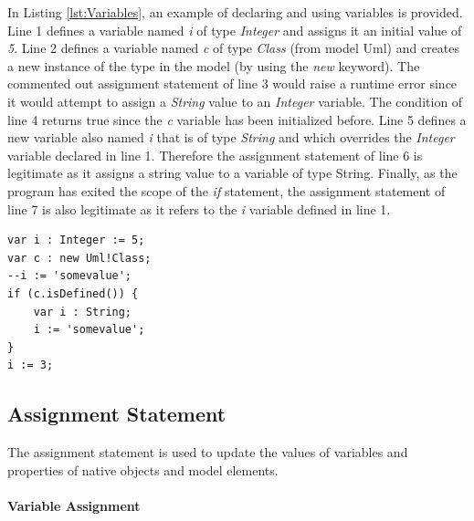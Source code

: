 In Listing \ref{lst:Variables}, an example of declaring and using variables is provided. Line 1 defines a variable named \emph{i} of type \emph{Integer} and assigns it an initial value of \emph{5}. Line 2 defines a variable named \emph{c} of type \emph{Class} (from model Uml) and creates a new instance of the type in the model (by using the \emph{new} keyword). The commented out assignment statement of line 3 would raise a runtime error since it would attempt to assign a \emph{String} value to an \emph{Integer} variable. The condition of line 4 returns true since the \emph{c} variable has been initialized before. Line 5 defines a new variable also named \emph{i} that is of type \emph{String} and which overrides the \emph{Integer} variable declared in line 1. Therefore the assignment statement of line 6 is legitimate as it assigns a string value to a variable of type String. Finally, as the program has exited the scope of the \emph{if} statement, the assignment statement of line 7 is also legitimate as it refers to the \emph{i} variable defined in line 1.

\begin{lstlisting}[basicstyle=\ttfamily\footnotesize, flexiblecolumns=true, numbers=none, nolol=true, caption=Example illustrating declaration and use of variables, label=lst:Variables, numbers=left, language=EOL, tabsize=2]
var i : Integer := 5;
var c : new Uml!Class;
--i := 'somevalue';
if (c.isDefined()) {
	var i : String;
	i := 'somevalue';
}
i := 3;
\end{lstlisting}

\subsection{Assignment Statement}

The assignment statement is used to update the values of variables and  properties of native objects and model elements.

\paragraph{Variable Assignment}

